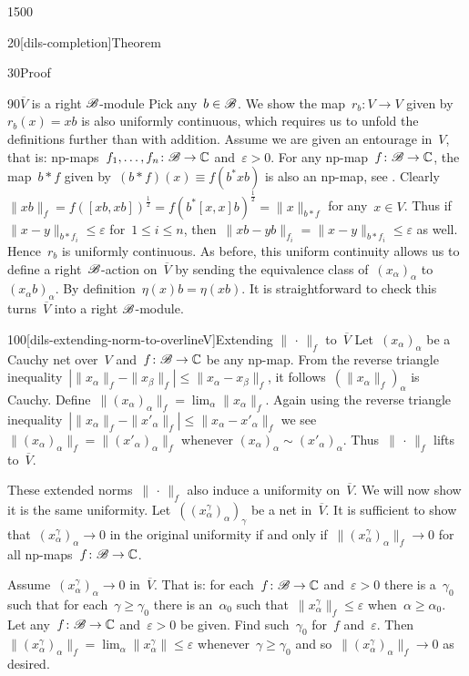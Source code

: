\begin{parsec}{1500}
\begin{point}{20}[dils-completion]{Theorem}
\begin{point}{30}{Proof}
\begin{point}{90}{$\overline{V}$ is a right $\mathscr{B}$-module}
Pick any~$b \in \mathscr{B}$. We show the map~$r_b\colon V \to V$
given by~$r_b(x) = xb$ is also uniformly continuous,
which requires us to unfold the definitions further
than with addition.
Assume we are given an entourage in~$V$,
that is: np-maps~$f_1,\ldots,f_n\colon \mathscr{B} \to \mathbb{C}$
and~$\varepsilon > 0$.
For any np-map~$f\colon \mathscr{B} \to \mathbb{C}$,
    the map~$b*f$ given by~$(b * f)(x) \equiv f(b^* x b)$ is also an np-map,
    see .
    Clearly~$\|xb\|_f = f([xb,xb])^{\frac{1}{2}}
    = f(b^* [x,x] b)^{\frac{1}{2}} = \|x\|_{b*f}$
    for any~$x \in V$.
Thus if~$\|x-y\|_{b*f_i} \leq \varepsilon$ for~$1 \leq i \leq n$,
then~$\|xb-yb\|_{f_i} = \|x-y\|_{b*f_i} \leq \varepsilon$
as well. Hence~$r_b$ is uniformly continuous.
As before, this uniform continuity
allows us to define a right~$\mathscr{B}$-action on~$\overline{V}$
by sending the equivalence class of~$(x_\alpha)_\alpha$
to~$(x_\alpha b)_\alpha$. By definition~$\eta(x)b = \eta(xb)$.
It is straightforward to check this turns~$\overline{V}$
into a right $\mathscr{B}$-module.
\end{point}
\begin{point}{100}[dils-extending-norm-to-overlineV]{Extending $\|\,\cdot\,\|_f$ to~$\overline{V}$}%
Let~$(x_\alpha)_\alpha$ be a Cauchy net over~$V$
    and~$f\colon \mathscr{B} \to \mathbb{C}$ be any np-map.
From the reverse triangle inequality~$| \|x_\alpha \|_f - \|x_\beta\|_f |
        \leq \|x_\alpha - x_\beta \|_f$,
        it follows~$(\| x_\alpha \|_f)_\alpha$ is Cauchy.
Define~$\|(x_\alpha)_\alpha\|_f = \lim_\alpha \|x_\alpha\|_f$.
Again using the reverse triangle
    inequality~$| \|x_\alpha \|_f - \|x'_\alpha\|_f |
        \leq \|x_\alpha - x'_\alpha \|_f$
        we see $\|(x_\alpha)_\alpha\|_f =
        \|(x'_\alpha)_\alpha\|_f$
        whenever $(x_\alpha)_\alpha \sim (x'_\alpha)_\alpha$.
Thus~$\|\,\cdot\,\|_f$ lifts to~$\overline{V}$.

These extended norms~$\|\,\cdot\,\|_f$ also induce a uniformity
    on~$\overline{V}$.  We will now show it is the same uniformity.
    Let~$((x_\alpha^\gamma)_\alpha)_\gamma$ be a net in~$\overline{V}$.
    It is sufficient to show that~$(x_\alpha^\gamma)_\alpha \to 0$
    in the original uniformity
    if and only if~$\|(x_\alpha^\gamma)_\alpha\|_f \to 0$
        for all np-maps~$f\colon \mathscr{B} \to \mathbb{C}$.

Assume~$(x^\gamma_\alpha)_\alpha \to 0$ in~$\overline{V}$.
That is: for each~$f\colon \mathscr{B} \to \mathbb{C}$ and~$\varepsilon > 0$
    there is a~$\gamma_0$
    such that for each~$\gamma \geq \gamma_0$
    there is an~$\alpha_0$
    such that~$\|x^\gamma_\alpha\|_f \leq \varepsilon$
    when~$\alpha \geq \alpha_0$.
Let any~$f\colon \mathscr{B} \to \mathbb{C}$ and~$\varepsilon > 0$ be given.
Find such~$\gamma_0$ for~$f$ and~$\varepsilon$.
Then~$\|(x^\gamma_\alpha)_\alpha \|_f
    = \lim_\alpha \|x^\gamma_\alpha\| \leq \varepsilon$
    whenever~$\gamma \geq \gamma_0$
    and so~$\|(x^\gamma_\alpha)_\alpha\|_f \to 0$ as desired.


\end{point}
\end{point}
\end{point}
\end{parsec}
